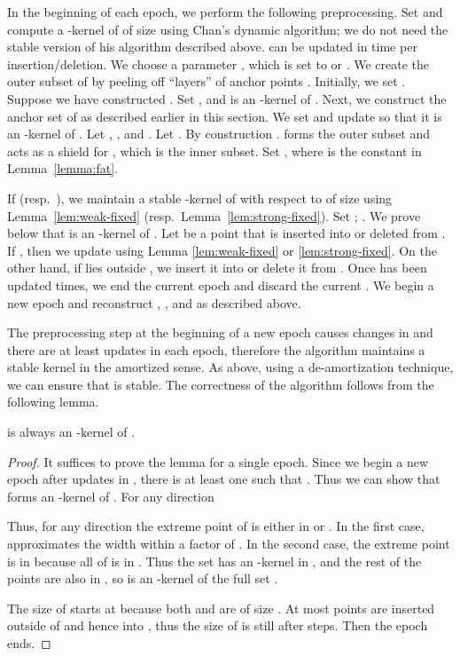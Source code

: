 \documentclass[11pt]{myclass}
\begin{document}
In the beginning of each epoch, we perform the following preprocessing.
Set  and compute a -kernel  of  
of size  using Chan's dynamic algorithm; we do not need the stable 
version of his algorithm described above.   can be updated
in  time per insertion/deletion.
We choose a parameter , which is set to  or 
. We create the outer subset of  by peeling off 
 ``layers'' of anchor points .
Initially, we set . Suppose we have constructed 
. Set ,
and  is an -kernel of .
Next, we construct the anchor set  of  
as described earlier in this section. We set 
and update  so that it is an -kernel of . Let 
, , and . Let
. By construction .   forms the outer subset and acts as a shield for , which is the inner subset. 
Set , where  is the constant in Lemma~\ref{lemma:fat}.

If  (resp.\ ), we maintain a stable
-kernel  of  with respect to  of size 
using Lemma~\ref{lem:weak-fixed} (resp.\ Lemma~\ref{lem:strong-fixed}).
Set 
; . We prove below that  is an 
-kernel of .
Let  be a point that is inserted into or deleted from .
If , then we update   using 
Lemma \ref{lem:weak-fixed} or \ref{lem:strong-fixed}.  On the other hand,
if  lies outside , we insert it into or delete it from .
Once  has been updated  times, we end the current epoch and discard the 
current . We begin a new epoch and reconstruct
, , and  as described above. 

The preprocessing step at the  beginning of a new epoch causes  changes in 
and there are at least  updates in each epoch, therefore 
the algorithm maintains a 
stable kernel in the amortized sense. As above, using a de-amortization 
technique, we can ensure that  is stable. The correctness of the 
algorithm follows from the following lemma.





\begin{lemma}
\label{lem:anchor}
 is always an -kernel of .
\end{lemma}

\begin{proof}
It suffices to prove the lemma for a single epoch. Since we begin a new 
epoch after  updates in , there is at least one  such that
. 
Thus we can show that  forms an -kernel of 
.  For any direction 

Thus, for any direction  the extreme point of  is either in  or .  In the first case,  approximates the width within a factor of .  In the second case, the extreme point is in  because all of  is in .  
Thus the set  has an -kernel in , and the rest of the points are also in , so  is an -kernel of the full set .  

The size of  starts at  because both  and  are of size .  At most  points are inserted outside of  and hence into , thus the size of  is still  after  steps.  Then the epoch ends.
\end{proof}
\end{document}
